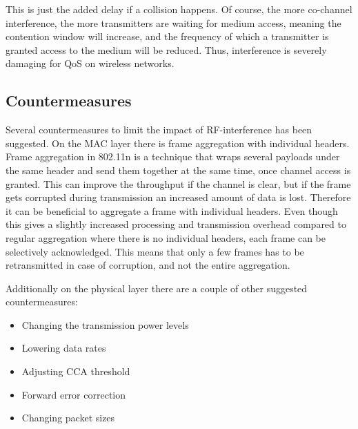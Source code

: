 	This is just the added delay if a collision happens. Of course, the more co-channel interference, the more transmitters are waiting for medium access, meaning
	the contention window will increase, and the frequency of which a transmitter is granted access to the medium will be reduced. Thus, interference is severely damaging for QoS on wireless networks.   %

	\subsection{Countermeasures}
	Several countermeasures to limit the impact of RF-interference has been suggested.
	On the MAC layer there is frame aggregation with individual headers.
	Frame aggregation in 802.11n is a technique that wraps several payloads under the same
	header and send them together at the same time, once channel access is granted. This can improve the throughput
	if the channel is clear, but if the frame gets corrupted during transmission
	an increased amount of data is lost.
	Therefore it can be beneficial to aggregate a frame with individual headers.
	Even though this gives a slightly increased processing and transmission overhead
	compared to regular aggregation where there is no individual headers, 
	each frame can be selectively acknowledged.
	This means that only a few frames has to be retransmitted in case of corruption,
	and not the entire aggregation. 

	Additionally on the physical layer there are a couple of other suggested countermeasures:
	\begin{itemize}
	\item Changing the transmission power levels
	\item Lowering data rates
	\item Adjusting CCA threshold
	\item Forward error correction
	\item Changing packet sizes
	\end{itemize}



